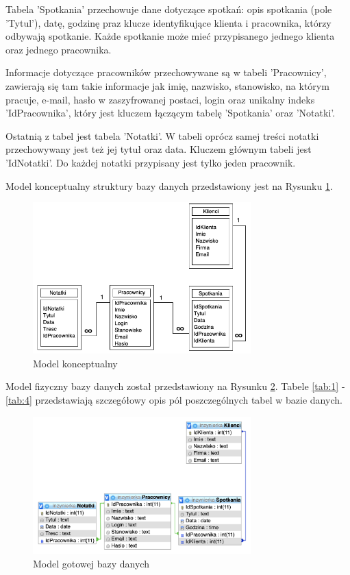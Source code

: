 \documentclass[eng,printmode,openany,oneside]{mgr}
\begin{document}
Tabela 'Spotkania' przechowuje dane dotyczące spotkań: opis spotkania (pole 'Tytul'), datę, godzinę praz klucze identyfikujące klienta i pracownika, którzy odbywają spotkanie. Każde spotkanie może mieć przypisanego jednego klienta oraz jednego pracownika.

Informacje dotyczące pracowników przechowywane są w tabeli 'Pracownicy', zawierają się tam takie informacje jak imię, nazwisko, stanowisko, na którym pracuje, e-mail, hasło w zaszyfrowanej postaci, login oraz unikalny indeks 'IdPracownika', który jest kluczem łączącym tabelę 'Spotkania' oraz 'Notatki'. 

Ostatnią z tabel jest tabela 'Notatki'. W tabeli oprócz samej treści notatki przechowywany jest też jej tytuł oraz data. Kluczem głównym tabeli jest 'IdNotatki'. Do każdej notatki przypisany jest tylko jeden pracownik. 

Model konceptualny struktury bazy danych przedstawiony jest na Rysunku \ref{fig:1}.


\begin{figure}[H]
	\centering
	\includegraphics[width=0.75\textwidth]{model_koncept}
	\caption{Model konceptualny}
	\label{fig:1}
\end{figure}

Model fizyczny bazy danych został przedstawiony na Rysunku \ref{fig:2}. Tabele \ref{tab:1} - \ref{tab:4} przedstawiają szczegółowy opis pól poszczególnych tabel w bazie danych.

\begin{figure}[H]
	\centering
	\includegraphics[width=0.75\textwidth]{model_logiczny}
	\caption{Model gotowej bazy danych}
	\label{fig:2}
\end{figure}
\end{document}
